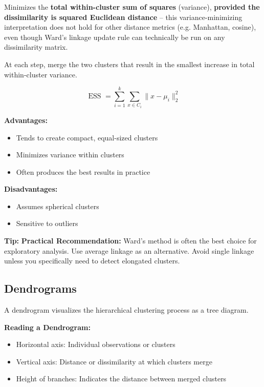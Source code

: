 \documentclass[
]{article}
\begin{document}
Minimizes the \textbf{total within-cluster sum of squares} (variance),
\textbf{provided the dissimilarity is squared Euclidean distance} --
this variance-minimizing interpretation does not hold for other distance
metrics (e.g. Manhattan, cosine), even though Ward's linkage update rule
can technically be run on any dissimilarity matrix.

At each step, merge the two clusters that result in the smallest
increase in total within-cluster variance.

\[\text{ ESS } = \sum_{i = 1}^{k}\sum_{x \in C_{i}}\| x - \mu_{i}\|_{2}^{2}\]

\textbf{Advantages:}

\begin{itemize}
\item
  Tends to create compact, equal-sized clusters
\item
  Minimizes variance within clusters
\item
  Often produces the best results in practice
\end{itemize}

\textbf{Disadvantages:}

\begin{itemize}
\item
  Assumes spherical clusters
\item
  Sensitive to outliers
\end{itemize}

\textbf{Tip: } \textbf{Practical Recommendation:} Ward's method is often
the best choice for exploratory analysis. Use average linkage as an
alternative. Avoid single linkage unless you specifically need to detect
elongated clusters.

\textbf{ }

\subsection{Dendrograms}

A dendrogram visualizes the hierarchical clustering process as a tree
diagram.

\textbf{Reading a Dendrogram:}

\begin{itemize}
\item
  Horizontal axis: Individual observations or clusters
\item
  Vertical axis: Distance or dissimilarity at which clusters merge
\item
  Height of branches: Indicates the distance between merged clusters
\end{itemize}
\end{document}
